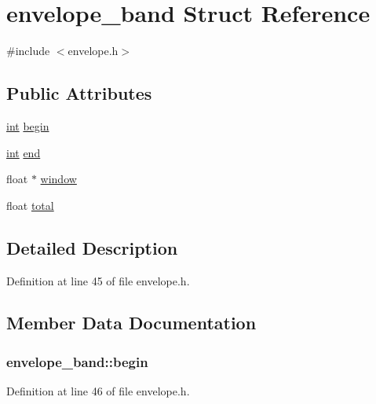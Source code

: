 \hypertarget{structenvelope__band}{}\section{envelope\+\_\+band Struct Reference}
\label{structenvelope__band}


{\ttfamily \#include $<$envelope.\+h$>$}

\subsection*{Public Attributes}
\begin{DoxyCompactItemize}
\item 
\hyperlink{xmltok_8h_a5a0d4a5641ce434f1d23533f2b2e6653}{int} \hyperlink{structenvelope__band_ae0ebaa120b782f4b798de3c445ac634b}{begin}
\item 
\hyperlink{xmltok_8h_a5a0d4a5641ce434f1d23533f2b2e6653}{int} \hyperlink{structenvelope__band_abf849c2990c227fc1d1667685c370bc2}{end}
\item 
float $\ast$ \hyperlink{structenvelope__band_ae5ee62ee2b75d2ecfac29d8a5f554287}{window}
\item 
float \hyperlink{structenvelope__band_a3f562ee35b24e837e858ddef98cbf5f7}{total}
\end{DoxyCompactItemize}


\subsection{Detailed Description}


Definition at line 45 of file envelope.\+h.



\subsection{Member Data Documentation}
\subsubsection[{\texorpdfstring{begin}{begin}}]{ envelope\+\_\+band\+::begin}\hypertarget{structenvelope__band_ae0ebaa120b782f4b798de3c445ac634b}{}\label{structenvelope__band_ae0ebaa120b782f4b798de3c445ac634b}


Definition at line 46 of file envelope.\+h.

